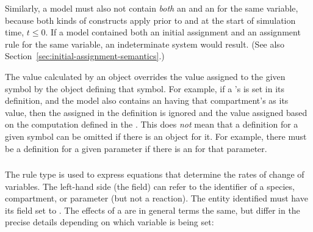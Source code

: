 Similarly, a model must also not contain \emph{both} an
\AssignmentRule and an \InitialAssignment for the same variable,
because both kinds of constructs apply prior to and at the start
of simulation time, \ie $t \leq 0$.  If a model contained both an
initial assignment and an assignment rule for the same variable,
an indeterminate system would result.  (See also
Section~\ref{sec:initial-assignment-semantics}.)

The value calculated by an \AssignmentRule object overrides the
value assigned to the given symbol by the object defining that
symbol.  For example, if a \Compartment's  is set in
its definition, and the model also contains an \AssignmentRule
having that compartment's  as its 
value, then the  assigned in the \Compartment
definition is ignored and the value assigned based on the
computation defined in the \AssignmentRule.  This does \emph{not}
mean that a definition for a given symbol can be omitted if there
is an \AssignmentRule object for it.  For example, there must be a
\Parameter definition for a given parameter if there is an
\AssignmentRule for that parameter.


\subsubsection{}
\label{sec:raterule}

The rule type \RateRule is used to express equations that
determine the rates of change of variables.  The left-hand side
(the  field) can refer to the identifier of a
species, compartment, or parameter (but not a reaction).  The
entity identified must have its  field set to
.  The effects of a \RateRule are in general terms the
same, but differ in the precise details depending on which
variable is being set:

